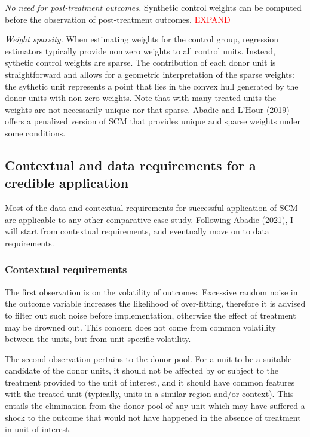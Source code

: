 \documentclass[12pt,a4paper,draft]{article}
\begin{document}
\emph{No need for post-treatment outcomes.} Synthetic control weights can be computed 
before the observation of post-treatment outcomes. \textcolor{red}{EXPAND}

\emph{Weight sparsity.} When estimating weights for 
the control group, regression estimators typically provide non zero weights to all control 
units. Instead, sythetic control weights are sparse. The contribution of each 
donor unit is straightforward and allows for a geometric interpretation of the 
sparse weights: the sythetic unit represents a point that lies in the convex hull 
generated by the donor units with non zero weights.
Note that with many treated units the weights are not necessarily unique nor 
that sparse. Abadie and L'Hour (2019) offers a penalized version of SCM that 
provides unique and sparse weights under some conditions.

\subsection{Contextual and data requirements for a credible application}

Most of the data and contextual requirements for successful application of 
SCM are applicable to any other comparative case study. Following Abadie (2021), I 
will start from contextual requirements, and eventually move on to data requirements.

\subsubsection{Contextual requirements}

The first observation is on the volatility of outcomes. Excessive random noise in the 
outcome variable increases the likelihood of over-fitting, therefore it is advised to 
filter out such noise before implementation, otherwise the effect of treatment 
may be drowned out. This concern does not come from common volatility between the 
units, but from unit specific volatility.

The second observation pertains to the donor pool. For a unit to be a suitable 
candidate of the donor units, it should not be affected by or subject to the 
treatment provided to the unit of interest, and it should have common features 
with the treated unit (typically, units in a similar region and/or context). 
This entails the elimination from the 
donor pool of any unit which may have suffered a shock to the outcome that would 
not have happened in the absence of treatment in unit of interest.
\end{document}
